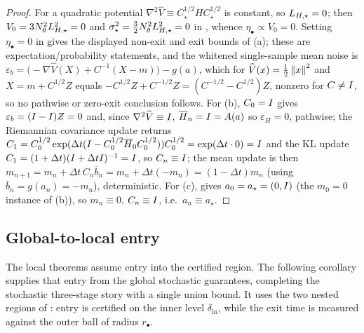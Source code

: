 \begin{proof}
For a quadratic potential $\nabla^2\widehat V\equiv C_\star^{1/2}HC_\star^{1/2}$ is constant, so
$L_{H,\star}=0$; then $V_0=3N_\theta^2L_{H,\star}^2=0$ and $\sigma_\star^2=\tfrac32N_\theta^2L_{H,\star}^2=0$ in
, whence $\eta_\bullet\propto V_0=0$. Setting $\eta_\bullet=0$ in
 gives the displayed non-exit and
exit bounds of (a); these are expectation/probability statements, and the whitened single-sample mean
noise is $\varepsilon_b=\bigl(-\nabla\widehat V(X)+C^{-1}(X-m)\bigr)-g(a)$, which for
$\widehat V(x)=\tfrac12\left\lVert x\right\rVert^2$ and $X=m+C^{1/2}Z$ equals $-C^{1/2}Z+C^{-1/2}Z=(C^{-1/2}-C^{1/2})Z$,
nonzero for $C\neq I$, so no pathwise or zero-exit conclusion follows. For (b), $C_0=I$ gives
$\varepsilon_b=(I-I)Z=0$ and, since $\nabla^2\widehat V\equiv I$, $\overline H_n=I=A(a)$ so
$\varepsilon_H=0$, pathwise; the Riemannian covariance update returns
$C_1=C_0^{1/2}\exp(\Delta t(I-C_0^{1/2}\overline H_0C_0^{1/2}))C_0^{1/2}=\exp(\Delta t\cdot0)=I$ and
the KL update $C_1=(1+\Delta t)(I+\Delta tI)^{-1}=I$, so $C_n\equiv I$; the mean update is then
$m_{n+1}=m_n+\Delta t\,C_n\overline b_n=m_n+\Delta t(-m_n)=(1-\Delta t)m_n$ (using
$\overline b_n=g(a_n)=-m_n$), deterministic. For (c),  gives
$a_0=a_\star=(0,I)$ (the $m_0=0$ instance of (b)), so $m_n\equiv0$, $C_n\equiv I$, i.e.\
$a_n\equiv a_\star$.
\end{proof}

\subsection{Global-to-local entry}
\label{subsec:global-to-local}

The local theorems assume entry into the certified region. The following corollary supplies that
entry from the global stochastic guarantees, completing the stochastic three-stage story with a
single union bound. It uses the two nested regions of \Cref{prop:finite-horizon}: entry is certified
on the inner level $\delta_{\mathrm{in}}$, while the exit time is measured against the outer ball of
radius $r_\bullet$.

